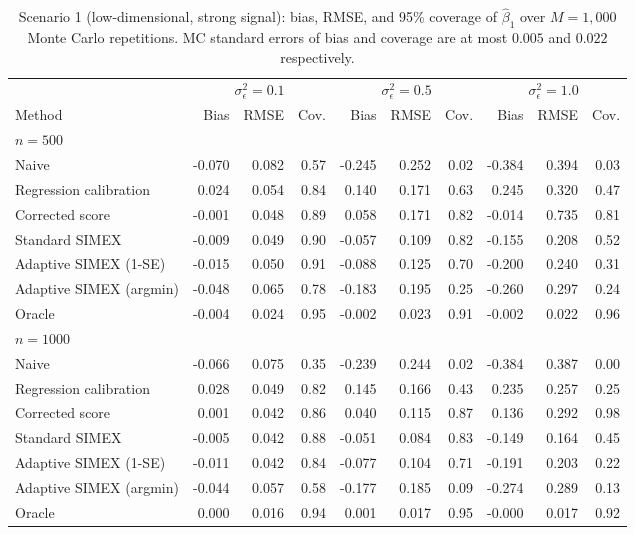 \begin{table}[t]
\centering
\footnotesize
\caption{Scenario 1 (low-dimensional, strong signal): bias, RMSE,
and 95\% coverage of $\hat\beta_1$ over $M=1{,}000$ Monte Carlo
repetitions. MC standard errors of bias and coverage are at most
$0.005$ and $0.022$ respectively.}
\label{tab:scenario1}
\begin{tabular}{l rrr rrr rrr}
\toprule
& \multicolumn{3}{c}{$\sigma^2_\epsilon = 0.1$} & \multicolumn{3}{c}{$\sigma^2_\epsilon = 0.5$} & \multicolumn{3}{c}{$\sigma^2_\epsilon = 1.0$} \\
\cmidrule(lr){2-4}\cmidrule(lr){5-7}\cmidrule(lr){8-10}
Method & Bias & RMSE & Cov. & Bias & RMSE & Cov. & Bias & RMSE & Cov. \\
\midrule
\multicolumn{10}{l}{\emph{$n = 500$}} \\
Naive & -0.070 & 0.082 & 0.57 & -0.245 & 0.252 & 0.02 & -0.384 & 0.394 & 0.03 \\
Regression calibration & 0.024 & 0.054 & 0.84 & 0.140 & 0.171 & 0.63 & 0.245 & 0.320 & 0.47 \\
Corrected score & -0.001 & 0.048 & 0.89 & 0.058 & 0.171 & 0.82 & -0.014 & 0.735 & 0.81 \\
Standard SIMEX & -0.009 & 0.049 & 0.90 & -0.057 & 0.109 & 0.82 & -0.155 & 0.208 & 0.52 \\
Adaptive SIMEX (1-SE) & -0.015 & 0.050 & 0.91 & -0.088 & 0.125 & 0.70 & -0.200 & 0.240 & 0.31 \\
Adaptive SIMEX (argmin) & -0.048 & 0.065 & 0.78 & -0.183 & 0.195 & 0.25 & -0.260 & 0.297 & 0.24 \\
Oracle & -0.004 & 0.024 & 0.95 & -0.002 & 0.023 & 0.91 & -0.002 & 0.022 & 0.96 \\
\midrule
\multicolumn{10}{l}{\emph{$n = 1000$}} \\
Naive & -0.066 & 0.075 & 0.35 & -0.239 & 0.244 & 0.02 & -0.384 & 0.387 & 0.00 \\
Regression calibration & 0.028 & 0.049 & 0.82 & 0.145 & 0.166 & 0.43 & 0.235 & 0.257 & 0.25 \\
Corrected score & 0.001 & 0.042 & 0.86 & 0.040 & 0.115 & 0.87 & 0.136 & 0.292 & 0.98 \\
Standard SIMEX & -0.005 & 0.042 & 0.88 & -0.051 & 0.084 & 0.83 & -0.149 & 0.164 & 0.45 \\
Adaptive SIMEX (1-SE) & -0.011 & 0.042 & 0.84 & -0.077 & 0.104 & 0.71 & -0.191 & 0.203 & 0.22 \\
Adaptive SIMEX (argmin) & -0.044 & 0.057 & 0.58 & -0.177 & 0.185 & 0.09 & -0.274 & 0.289 & 0.13 \\
Oracle & 0.000 & 0.016 & 0.94 & 0.001 & 0.017 & 0.95 & -0.000 & 0.017 & 0.92 \\
\bottomrule
\end{tabular}
\end{table}